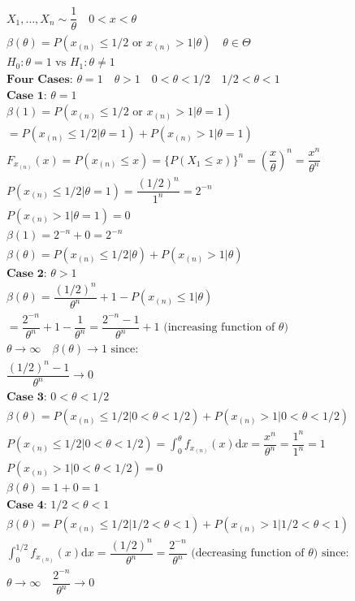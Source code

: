 \documentclass{article}
\newcommand{\dx}{\mathrm{d}x}
\newcommand{\B}{\beta}
\newcommand{\ta}{\theta}
\newcommand{\samp}{X_1,\dots,X_n \sim}
\newcommand{\xn}{x_{(n)}}
\newcommand{\pow}{\B(\ta)}
\begin{document}
\begin{flushleft}
\begin{multline*}\\
\samp \dfrac{1}{\ta} \quad 0<x<\ta\\
\B(\ta)=P(\xn \leq 1/2 \text{ or } \xn >1|\ta) \quad\ta\in \Theta\\
H_0: \ta=1 \text{ vs } H_1: \ta\neq 1\\
\textbf{Four Cases: } \ta=1 \quad \ta>1 \quad   0<\ta<1/2 \quad 1/2<\ta<1\\
\textbf{Case 1: } \ta=1\\
\B(1)=P(\xn \leq 1/2 \text{ or } \xn >1|\ta=1)\\
=P(\xn \leq 1/2|\ta=1)+P(\xn >1|\ta=1)\\
F_{\xn}(x)=P(\xn\leq x)=\{P(X_1\leq x) \}^n
=\left(\dfrac{x}{\ta}\right)^n=\dfrac{x^n}{\ta^n}\\
P(\xn \leq 1/2|\ta=1)=\dfrac{(1/2)^n}{1^n}=2^{-n}\\
P(\xn >1|\ta=1)=0\\
\B(1)=2^{-n}+0=2^{-n}\\
\B(\ta)=P(\xn \leq 1/2|\ta)+P(\xn >1|\ta)\\
\textbf{Case 2: } \ta>1\\
\B(\ta)=\dfrac{(1/2)^n}{\ta^n}+1-P(\xn\leq 1|\ta)\\
=\dfrac{2^{-n}}{\ta^n}+1-\dfrac{1}{\ta^n}=\dfrac{2^{-n}-1}{\ta^n}+1 \text{ (increasing function of } \ta)\\
\ta\to\infty \quad \pow \to 1 \text{ since:}\\
\dfrac{(1/2)^n-1}{\ta^n}\to 0\\
\textbf{Case 3: } 0<\ta<1/2\\
\B(\ta)=P(\xn \leq 1/2|0<\ta<1/2)+P(\xn >1|0<\ta<1/2)\\
P(\xn \leq 1/2|0<\ta<1/2)=\int_{0}^{\ta}f_{\xn}(x)\dx=\dfrac{x^n}{\ta^n}=\dfrac{1^n}{1^n}=1\\
P(\xn >1|0<\ta<1/2)=0\\
\pow=1+0=1\\
\textbf{Case 4: } 1/2<\ta<1\\
\B(\ta)=P(\xn \leq 1/2|1/2<\ta<1)+P(\xn >1|1/2<\ta<1)\\
\int_{0}^{1/2}f_{\xn}(x)\dx=\dfrac{(1/2)^n}{\ta^n}=\dfrac{2^{-n}}{\ta^n} \text{ (decreasing function of } \ta) \text{ since:}\\
\ta\to\infty \quad \dfrac{2^{-n}}{\ta^n}\to 0\\
\end{multline*}

\end{flushleft}
\end{document}
